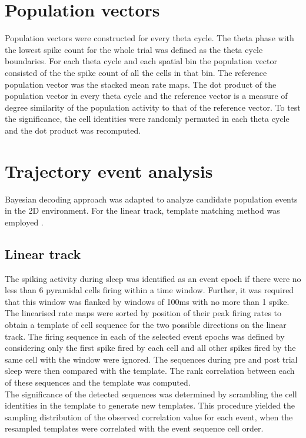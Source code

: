 \section{Population vectors}
Population vectors were constructed for every theta cycle. The theta phase with the lowest spike count for the whole trial was defined as the theta cycle boundaries. For each theta cycle and each spatial bin the population vector consisted of the the spike count of all the cells in that bin. The reference population vector was the stacked mean rate maps. The dot product of the population vector in every theta cycle and the reference vector is a measure of degree similarity of the population activity to that of the reference vector. To test the significance, the cell identities were randomly permuted in each theta cycle and the dot product was recomputed. 


\section{Trajectory event analysis}
Bayesian decoding approach was adapted to analyze candidate population events in the 2D environment. For the linear track, template matching method was employed \cite{Dragoi2013a}. 
\subsection{Linear track}
The spiking activity during sleep was identified as an event epoch if there were no less than 6 pyramidal cells firing within a time window. Further, it was required that this window was flanked by windows of 100ms with no more than 1 spike. The linearised rate maps were sorted by position of their peak firing rates to obtain a template of cell sequence for the two possible directions on the linear track. The firing sequence in each of the selected event epochs was defined by considering only the first spike fired by each cell and all other spikes fired by the same cell with the window were ignored. The sequences during pre and post trial sleep were then compared with the template. The rank correlation between each of these sequences and the template was computed. \\ 
The significance of the detected sequences was determined by scrambling the cell identities in the template to generate new templates. This procedure yielded the sampling distribution of the observed correlation value for each event, when the resampled templates were correlated with the event sequence cell order.\\

